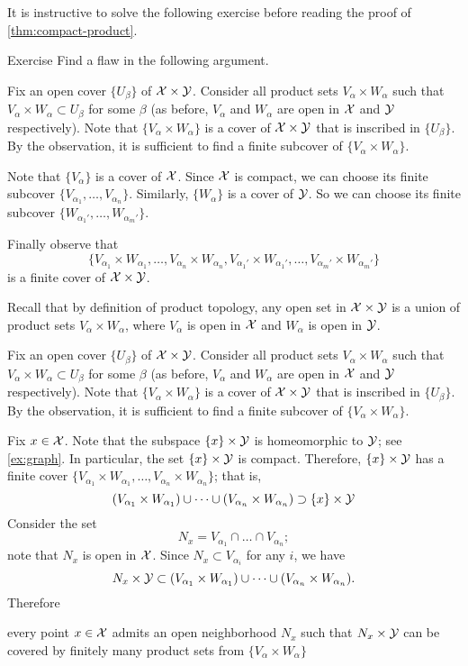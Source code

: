 It is instructive to solve the following exercise before reading the proof of \ref{thm:compact-product}.

\begin{thm}{Exercise}\label{ex:fake-proof(thm:compact-product)}
Find a flaw in the following argument.
\end{thm}

Fix an open cover $\{U_\beta\}$ of $\mathcal{X}\times\mathcal{Y}$.
Consider all product sets $V_\alpha\times W_\alpha$ such that $V_\alpha\times W_\alpha\subset U_\beta$ for some $\beta$ (as before, $V_\alpha$ and $W_\alpha$ are open in $\mathcal{X}$ and $\mathcal{Y}$ respectively).
Note that $\{V_\alpha\times W_\alpha\}$ is a cover of $\mathcal{X}\times\mathcal{Y}$ that is inscribed in $\{U_\beta\}$.
By the observation, it is sufficient to find a finite subcover of $\{V_\alpha\times W_\alpha\}$.

Note that $\{V_\alpha\}$ is a cover of $\mathcal{X}$.
Since $\mathcal{X}$ is compact, we can choose its finite subcover $\{V_{\alpha_1},\dots,V_{\alpha_n}\}$.
Similarly, $\{W_\alpha\}$ is a cover of $\mathcal{Y}$.
So we can choose its finite subcover $\{W_{\alpha_1'},\dots,W_{\alpha_m'}\}$.

Finally observe that 
\[\{V_{\alpha_1}\times W_{\alpha_1},\dots,V_{\alpha_n}\times W_{\alpha_n},V_{\alpha_1'}\times W_{\alpha_1'},\dots,V_{\alpha_m'}\times W_{\alpha_m'}\}\] is a finite cover of $\mathcal{X}\times\mathcal{Y}$.
\qeds

Recall that by definition of product topology, any open set in $\mathcal{X}\times\mathcal{Y}$ is a union of product sets 
$V_\alpha\times W_\alpha$, where $V_\alpha$ is open in $\mathcal{X}$ and $W_\alpha$ is open in $\mathcal{Y}$.

Fix an open cover $\{U_\beta\}$ of $\mathcal{X}\times\mathcal{Y}$.
Consider all product sets $V_\alpha\times W_\alpha$ such that $V_\alpha\times W_\alpha\subset U_\beta$ for some $\beta$ (as before, $V_\alpha$ and $W_\alpha$ are open in $\mathcal{X}$ and $\mathcal{Y}$ respectively).
Note that $\{V_\alpha\times W_\alpha\}$ is a cover of $\mathcal{X}\times\mathcal{Y}$ that is inscribed in $\{U_\beta\}$.
By the observation, it is sufficient to find a finite subcover of $\{V_\alpha\times W_\alpha\}$.

Fix $x \in \mathcal{X}$.
Note that the subspace $\{x\}\times \mathcal{Y}$ is homeomorphic to $\mathcal{Y}$; see \ref{ex:graph}.
In particular, the  set $\{x\}\times \mathcal{Y}$ is compact.
Therefore, $\{x\}\times \mathcal{Y}$ has a finite cover $\{V_{\alpha_1}\times W_{\alpha_1},\dots,V_{\alpha_n}\times W_{\alpha_n}\}$; that is,
\[(V_{\alpha_1}\times W_{\alpha_1})\cup\dots\cup
(V_{\alpha_n}\times W_{\alpha_n})
\supset \{x\}\times \mathcal{Y}\]
Consider the set
\[N_x=V_{\alpha_1}\cap\dots\cap V_{\alpha_n};\]
note that $N_x$ is  open in $\mathcal{X}$.
Since $N_x\subset V_{\alpha_i}$ for any $i$, we have
\[N_x\times \mathcal{Y}\subset (V_{\alpha_1}\times W_{\alpha_1})\cup\dots\cup
(V_{\alpha_n}\times W_{\alpha_n}).\]
Therefore
\begin{clm}{}\label{clm:Nx}
every point $x\in\mathcal{X}$ admits an open neighborhood $N_x$ such that $N_x\times \mathcal{Y}$ can be covered by finitely many product sets from $\{V_\alpha\times W_\alpha\}$
\end{clm}



